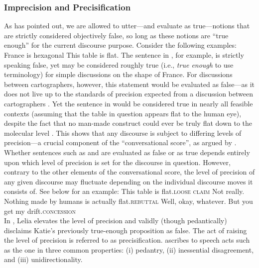 \subsubsection{Imprecision and Precisification}
As \textcite[p. 352ff]{Lewis1979} has pointed out, we are allowed to utter---and evaluate as true---notions that are strictly considered objectively false, so long as these notions are \enquote{true enough} for the current discourse purpose. Consider the following examples:
\pex[nopreamble=true]%
\a{} France is hexagonal\hfill\parencite[p. 142]{Austin1976}
\a{} This table is flat.\xe
The sentence in , for example, is strictly speaking false, yet may be considered roughly true (i.e., \textit{true enough} to use  terminology) for simple discussions on the shape of France. For discussions between cartographers, however, this statement would be evaluated as false---as it does not live up to the standards of precision expected from a discussion between cartographers \parencite[p. 142]{Austin1976}. Yet the sentence in  would be considered true in nearly all feasible contexts (assuming that the table in question appears flat to the human eye), despite the fact that no man-made construct could ever be truly flat down to the molecular level \parencite[for details, see][]{Unger1975}. This shows that any discourse is subject to differing levels of precision---a crucial component of the \enquote{conversational score}, as argued by \textcite{Lewis1979}. Whether sentences such as  and  are evaluated as false or as true depends entirely upon which level of precision is set for the discourse in question. However, contrary to the other elements of the conversational score, the level of precision of any given discourse may fluctuate depending on the individual discourse moves it consists of. See below for an example:
\pex{}%
\a{}This table is flat.\hfill{\scshape loose claim}
\a{}Not really. Nothing made by humans is actually flat.\hfill{\scshape rebuttal}
\a{}Well, okay, whatever. But you get my drift.\hfill{\scshape concession}\\
\emptyfill\parencite[p. 113]{Klecha2014}
\xe
In , Lelia elevates the level of precision and validly (though pedantically) disclaims Katie's previously true-enough proposition as false. The act of raising the level of precision is referred to as precisification. \textcite[p. 114]{Klecha2014} ascribes to speech acts such as the one in  three common properties: (i) pedantry, (ii) inessential disagreement, and (iii) unidirectionality.

